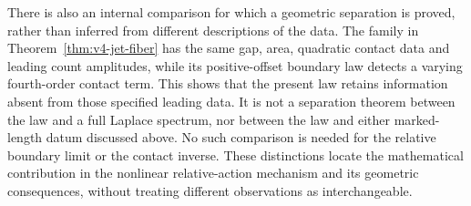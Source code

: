 There is also an internal comparison for which a geometric separation is
proved, rather than inferred from different descriptions of the data.
The family in Theorem~\ref{thm:v4-jet-fiber} has the same gap, area,
quadratic contact data and leading count amplitudes, while its
positive-offset boundary law detects a varying fourth-order contact term.
This shows that the present law retains information absent from those
specified leading data.  It is not a separation theorem between the law
and a full Laplace spectrum, nor between the law and either marked-length
datum discussed above.  No such comparison is needed for the relative
boundary limit or the contact inverse.  These distinctions locate the
mathematical contribution in the nonlinear relative-action mechanism and
its geometric consequences, without treating different observations as
interchangeable.
